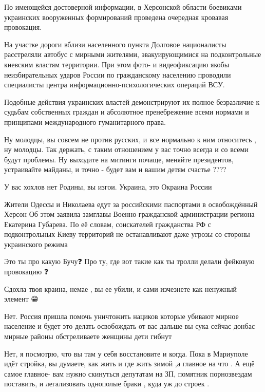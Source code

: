 По имеющейся достоверной информации, в Херсонской области боевиками украинских
вооруженных формирований проведена очередная кровавая провокация.

На участке дороги вблизи населенного пункта Долговое националисты расстреляли
автобус с мирными жителями, эвакуирующимися на подконтрольные киевским властям
территории. При этом фото- и видеофиксацию якобы неизбирательных ударов России
по гражданскому населению проводили специалисты центра
информационно-психологических операций ВСУ.

Подобные действия украинских властей демонстрируют их полное безразличие к
судьбам собственных граждан и абсолютное пренебрежение всеми нормами и
принципами международного гуманитарного права.

Ну молодцы, вы совсем не против русских, и все нормально к ним относитесь , ну
молодцы. Так держать, с таким отношением у вас точно всегда и со всеми будут
проблемы. Ну выходите на митинги почаще, меняйте президентов, устраивайте
майданы, и точно - будет вам и вашим детям счастье ????

У вас хохлов нет Родины, вы изгои. Украина, это Окраина России

Жители Одессы и Николаева едут за российскими паспортами в освобождённый Херсон
Об этом заявила замглавы Военно-гражданской администрации региона Екатерина
Губарева.  По её словам, соискателей гражданства РФ с подконтрольных Киеву
территорий не останавливают даже угрозы со стороны украинского режима

Это ты про какую Бучу❓
Про ту, где вот такие как ты тролли делали фейковую провокацию ❓

Сдохла твоя краина, немае , вы ее убили, и сами изчезнете как ненужный элемент 😁👏👏👏

Нет. Россия пришла помочь уничтожить нациков которые убивают мирное население и
будет это делать освобождать от вас дальше вы сука сейчас донбас мирные районы
обстреливаете женщины дети гибнут

Нет, я посмотрю, что вы там у себя восстановите и когда. Пока в Мариуполе идёт
стройка, вы думаете, как жить и где жить зимой ,а главное на что . А ещё самое
главное- вам нужно скинуться депутатам на ЗП, помятник порнозвездам поставить,
и легализовать однополые браки , куда уж до строек .
